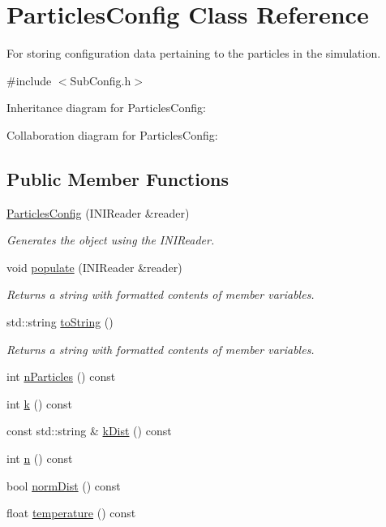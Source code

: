 \hypertarget{classParticlesConfig}{\section{Particles\+Config Class Reference}
\label{classParticlesConfig}
}


For storing configuration data pertaining to the particles in the simulation.  




{\ttfamily \#include $<$Sub\+Config.\+h$>$}



Inheritance diagram for Particles\+Config\+:


Collaboration diagram for Particles\+Config\+:
\subsection*{Public Member Functions}
\begin{DoxyCompactItemize}
\item 
\hyperlink{classParticlesConfig_ac208b54f3693c9a33bd79ce5f8803fd6}{Particles\+Config} (I\+N\+I\+Reader \&reader)
\begin{DoxyCompactList}\small\item\em Generates the object using the I\+N\+I\+Reader. \end{DoxyCompactList}\item 
void \hyperlink{classParticlesConfig_a9bdb5293661f70cb9d3ac94d3e03d77b}{populate} (I\+N\+I\+Reader \&reader)
\begin{DoxyCompactList}\small\item\em Returns a string with formatted contents of member variables. \end{DoxyCompactList}\item 
std\+::string \hyperlink{classParticlesConfig_a7a2244687fcb09024e777bd312823d53}{to\+String} ()
\begin{DoxyCompactList}\small\item\em Returns a string with formatted contents of member variables. \end{DoxyCompactList}\item 
int \hyperlink{classParticlesConfig_aa2a7ce6238307dbea536c38c241545d6}{n\+Particles} () const 
\item 
int \hyperlink{classParticlesConfig_ab6827658032caa9a675e37479f073336}{k} () const 
\item 
const std\+::string \& \hyperlink{classParticlesConfig_a6995e1414281b68e271cfb8901332afd}{k\+Dist} () const 
\item 
int \hyperlink{classParticlesConfig_a8e452288574a56638e5c886ef4d461b4}{n} () const 
\item 
bool \hyperlink{classParticlesConfig_a5da3661ac4117b27199cf6e3d1b3a063}{norm\+Dist} () const 
\item 
float \hyperlink{classParticlesConfig_aa1a8721e3bd85a82a87e3514917e17fb}{temperature} () const 
\end{DoxyCompactItemize}
